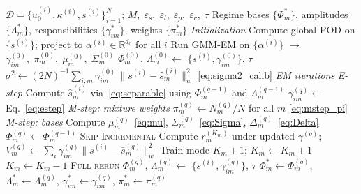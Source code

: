 \documentclass[preprint,10pt]{elsarticle}
\begin{document}
\begin{algorithm}[H]
\caption{\textsc{TEMPO}}
\label{alg:tempo}
\begin{algorithmic}[1]
\Require $\mathcal{D} = \{u_0^{(i)}, \kappa^{(i)}, s^{(i)}\}_{i=1}^N$;\;
  $M,\;\varepsilon_s,\;\varepsilon_l,\;\varepsilon_p,\;\varepsilon_c,\;\tau$
\Ensure Regime bases $\{\Phi_m^*\}$,\;
  amplitudes $\{\Lambda_m^*\}$,\;
  responsibilities $\{\gamma_{im}^*\}$,\;
  weights $\{\pi_m^*\}$
%
\Statex \textit{Initialization}
\State Compute global POD on $\{s^{(i)}\}$;
  project to $\alpha^{(i)} \in \mathbb{R}^{d_0}$ for all $i$
\State Run GMM-EM on $\{\alpha^{(i)}\}$ $\to$
  $\gamma_{im}^{(0)},\;\pi_m^{(0)},\;\mu_m^{(0)},\;\Sigma_m^{(0)}$
  \State $\Phi_m^{(0)},\,\Lambda_m^{(0)} \leftarrow$
    {$\{s^{(i)},\gamma_{im}^{(0)}\},\,\tau$}
    \hfill{}
\EndFor
\State $\sigma^2 \leftarrow (2N)^{-1}\!\sum_{i,m}
  \gamma_{im}^{(0)}\,\|s^{(i)}{-}\hat{s}_m^{(i)}\|_w^2$
  \hfill\eqref{eq:sigma2_calib}
%
\Statex \textit{EM iterations}
\Repeat
  \Statex \quad\textit{E-step}
    \State Compute $\hat{s}_m^{(i)}$ via~\eqref{eq:separable}
      using $\Phi_m^{(q-1)}$ and $\Lambda_m^{(q-1)}$
    \State $\gamma_{im}^{(q)} \leftarrow$ Eq.~\eqref{eq:estep}
  \EndFor
  \Statex \quad\textit{M-step: mixture weights}
  \State $\pi_m^{(q)} \leftarrow N_m^{(q)}/N$
    for all $m$ \hfill\eqref{eq:mstep_pi}
  \Statex \quad\textit{M-step: bases}
    \State Compute $\mu_m^{(q)}$~\eqref{eq:mu},\;
      $\Sigma_m^{(q)}$~\eqref{eq:Sigma},\;
      $\Delta_m^{(q)}$~\eqref{eq:Delta}
      \State $\Phi_m^{(q)} \leftarrow \Phi_m^{(q-1)}$
        \hfill \textsc{Skip}
      \hfill \textsc{Incremental}
      \State Compute $r_m^{(K_m)}$ under updated $\gamma^{(q)}$;\;
        $V_m^{(q)} \leftarrow \sum_i\gamma_{im}^{(q)}\|s^{(i)}{-}\bar{s}_m^{(q)}\|_w^2$
        \State Train mode $K_m{+}1$;\; $K_m \leftarrow K_m + 1$
      \EndIf
        \State $K_m \leftarrow K_m - 1$
      \EndIf
    \Else
      \hfill \textsc{Full rerun}
      \State $\Phi_m^{(q)},\,\Lambda_m^{(q)} \leftarrow$
        {$\{s^{(i)},\gamma_{im}^{(q)}\},\,\tau$}
    \EndIf
  \EndFor
{}
\State \Return $\Phi_m^* \!\leftarrow\! \Phi_m^{(q)}$,\;
  $\Lambda_m^* \!\leftarrow\! \Lambda_m^{(q)}$,\;
  $\gamma_{im}^* \!\leftarrow\! \gamma_{im}^{(q)}$,\;
  $\pi_m^* \!\leftarrow\! \pi_m^{(q)}$
\end{algorithmic}
\end{algorithm}
\end{document}

